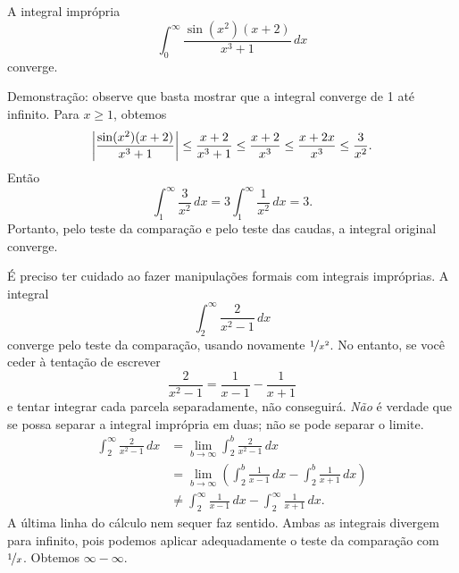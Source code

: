 \begin{example}
A integral imprópria
\begin{equation*}
\int_0^\infty \frac{\sin(x^2)(x+2)}{x^3+1} \,dx
\end{equation*}
converge.

Demonstração: observe que basta mostrar
que a integral converge de 1 até infinito.
Para $x \geq 1$, obtemos
\begin{equation*}
\left\lvert {\frac{\sin(x^2)(x+2)}{x^3+1}} \right\rvert
\leq
\frac{x+2}{x^3+1}
\leq \frac{x+2}{x^3} \leq
\frac{x+2x}{x^3} \leq \frac{3}{x^2} .
\end{equation*}
Então
\begin{equation*}
\int_1^\infty \frac{3}{x^2}\,dx
=
3 \int_1^\infty \frac{1}{x^2}\,dx
=
3 .
\end{equation*}
Portanto, pelo teste da comparação e pelo teste das caudas, a integral
original converge.
\end{example}

\begin{example}
É preciso ter cuidado ao fazer manipulações formais com integrais
impróprias.
A integral
\begin{equation*}
\int_2^\infty \frac{2}{x^2-1}\,dx
\end{equation*}
converge pelo teste da comparação, usando novamente $\nicefrac{1}{x^2}$.
No entanto, se você ceder à tentação de escrever
\begin{equation*}
\frac{2}{x^2-1} = 
\frac{1}{x-1}
-
\frac{1}{x+1} 
\end{equation*}
e tentar integrar cada parcela separadamente, não conseguirá.
\emph{Não} é verdade que se possa separar a integral imprópria
em duas; não se pode separar o limite.
\begin{equation*}
\begin{split}
\int_2^\infty \frac{2}{x^2-1} \,dx &=
\lim_{b\to \infty} \int_2^b \frac{2}{x^2-1} \,dx
\\
&=
\lim_{b\to \infty}
\left(
\int_2^b \frac{1}{x-1}\,dx
-
\int_2^b \frac{1}{x+1}\,dx
\right)
\\
&\neq
\int_2^\infty \frac{1}{x-1}\,dx
-
\int_2^\infty \frac{1}{x+1}\,dx .
\end{split}
\end{equation*}
A última linha do cálculo nem sequer faz sentido. Ambas as integrais
divergem para infinito, pois podemos aplicar adequadamente o teste da
comparação com $\nicefrac{1}{x}$. Obtemos $\infty - \infty$.
\end{example}


